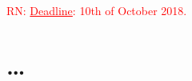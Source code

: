 \documentclass[a4paper, 11pt]{article}
\newcommand{\nevComment}[1]{\textcolor{red}{RN: #1}}
\begin{document}
\noindent
\nevComment{{\large \underline{Deadline}: 10th of October 2018.}}


\section{\dots}




\end{document}
